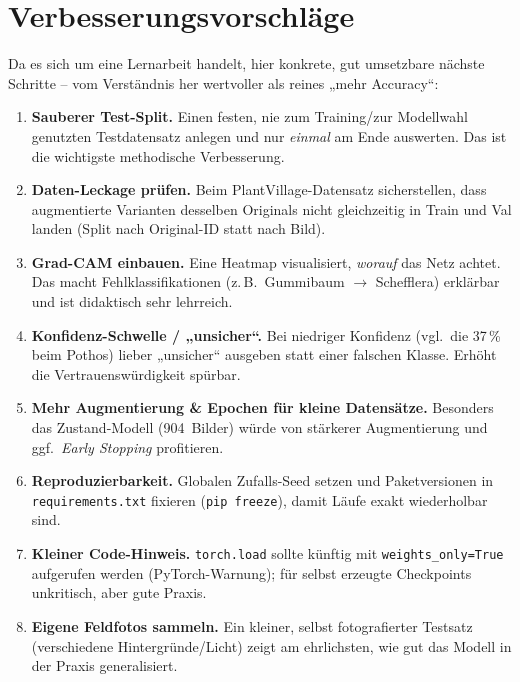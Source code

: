 \documentclass[11pt,a4paper]{article}
\begin{document}
\section{Verbesserungsvorschläge}
Da es sich um eine Lernarbeit handelt, hier konkrete, gut umsetzbare nächste
Schritte -- vom Verständnis her wertvoller als reines „mehr Accuracy“:

\begin{enumerate}[label=\textbf{\arabic*.}, nosep, itemsep=2pt]
  \item \textbf{Sauberer Test-Split.} Einen festen, nie zum Training/zur
        Modellwahl genutzten Testdatensatz anlegen und nur \emph{einmal} am Ende
        auswerten. Das ist die wichtigste methodische Verbesserung.
  \item \textbf{Daten-Leckage prüfen.} Beim PlantVillage-Datensatz sicherstellen,
        dass augmentierte Varianten desselben Originals nicht gleichzeitig in
        Train und Val landen (Split nach Original-ID statt nach Bild).
  \item \textbf{Grad-CAM einbauen.} Eine Heatmap visualisiert, \emph{worauf} das
        Netz achtet. Das macht Fehlklassifikationen (z.\,B.\ Gummibaum
        $\rightarrow$ Schefflera) erklärbar und ist didaktisch sehr lehrreich.
  \item \textbf{Konfidenz-Schwelle / „unsicher“.} Bei niedriger Konfidenz
        (vgl.\ die 37\,\% beim Pothos) lieber „unsicher“ ausgeben statt einer
        falschen Klasse. Erhöht die Vertrauenswürdigkeit spürbar.
  \item \textbf{Mehr Augmentierung \& Epochen für kleine Datensätze.} Besonders
        das Zustand-Modell (904~Bilder) würde von stärkerer Augmentierung und
        ggf.\ \emph{Early Stopping} profitieren.
  \item \textbf{Reproduzierbarkeit.} Globalen Zufalls-Seed setzen und
        Paketversionen in \texttt{requirements.txt} fixieren (\texttt{pip freeze}),
        damit Läufe exakt wiederholbar sind.
  \item \textbf{Kleiner Code-Hinweis.} \texttt{torch.load} sollte künftig mit
        \texttt{weights\_only=True} aufgerufen werden (PyTorch-Warnung); für
        selbst erzeugte Checkpoints unkritisch, aber gute Praxis.
  \item \textbf{Eigene Feldfotos sammeln.} Ein kleiner, selbst fotografierter
        Testsatz (verschiedene Hintergründe/Licht) zeigt am ehrlichsten, wie gut
        das Modell in der Praxis generalisiert.
\end{enumerate}
\end{document}
